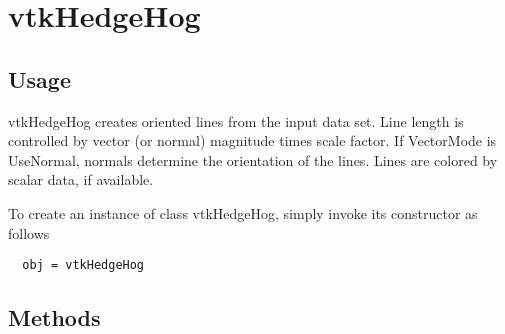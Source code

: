 \section{vtkHedgeHog}

\subsection{Usage}

 vtkHedgeHog creates oriented lines from the input data set. Line
 length is controlled by vector (or normal) magnitude times scale
 factor. If VectorMode is UseNormal, normals determine the orientation
 of the lines. Lines are colored by scalar data, if available.

To create an instance of class vtkHedgeHog, simply
invoke its constructor as follows
\begin{verbatim}
  obj = vtkHedgeHog
\end{verbatim}
\subsection{Methods}


